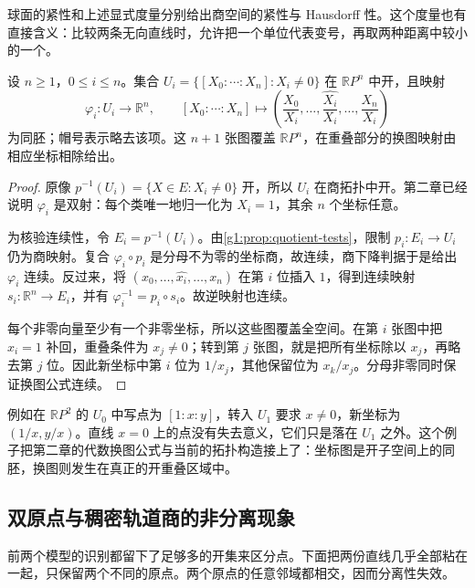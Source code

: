 球面的紧性和上述显式度量分别给出商空间的紧性与 Hausdorff 性。这个度量也有直接含义：比较两条无向直线时，允许把一个单位代表变号，再取两种距离中较小的一个。

\begin{proposition}\label{g1:prop:real-projective-topological-charts}
	设 \(n\ge1\)，\(0\le i\le n\)。集合 \(U_i=\{[X_0:\cdots:X_n]:X_i\ne0\}\) 在 \(\mathbb RP^n\) 中开，且映射
	\[
		\varphi_i:U_i\longrightarrow\mathbb R^n,\qquad
		[X_0:\cdots:X_n]\longmapsto
		\left(\frac{X_0}{X_i},\ldots,\widehat{\frac{X_i}{X_i}},\ldots,\frac{X_n}{X_i}\right)
	\]
	为同胚；帽号表示略去该项。这 \(n+1\) 张图覆盖 \(\mathbb RP^n\)，在重叠部分的换图映射由相应坐标相除给出。
\end{proposition}
\begin{proof}
	原像 \(p^{-1}(U_i)=\{X\in E:X_i\ne0\}\) 开，所以 \(U_i\) 在商拓扑中开。第二章已经说明 \(\varphi_i\) 是双射：每个类唯一地归一化为 \(X_i=1\)，其余 \(n\) 个坐标任意。

	为核验连续性，令 \(E_i=p^{-1}(U_i)\)。由\cref{g1:prop:quotient-tests}，限制 \(p_i:E_i\to U_i\) 仍为商映射。复合 \(\varphi_i\circ p_i\) 是分母不为零的坐标商，故连续，商下降判据于是给出 \(\varphi_i\) 连续。反过来，将 \((x_0,\ldots,\widehat{x_i},\ldots,x_n)\) 在第 \(i\) 位插入 \(1\)，得到连续映射 \(s_i:\mathbb R^n\to E_i\)，并有 \(\varphi_i^{-1}=p_i\circ s_i\)。故逆映射也连续。

	每个非零向量至少有一个非零坐标，所以这些图覆盖全空间。在第 \(i\) 张图中把 \(x_i=1\) 补回，重叠条件为 \(x_j\ne0\)；转到第 \(j\) 张图，就是把所有坐标除以 \(x_j\)，再略去第 \(j\) 位。因此新坐标中第 \(i\) 位为 \(1/x_j\)，其他保留位为 \(x_k/x_j\)。分母非零同时保证换图公式连续。
\end{proof}

例如在 \(\mathbb RP^2\) 的 \(U_0\) 中写点为 \([1:x:y]\)，转入 \(U_1\) 要求 \(x\ne0\)，新坐标为 \((1/x,y/x)\)。直线 \(x=0\) 上的点没有失去意义，它们只是落在 \(U_1\) 之外。这个例子把第二章的代数换图公式与当前的拓扑构造接上了：坐标图是开子空间上的同胚，换图则发生在真正的开重叠区域中。

\subsection{双原点与稠密轨道商的非分离现象}
\label{g1:subsec:0405:03}

前两个模型的识别都留下了足够多的开集来区分点。下面把两份直线几乎全部粘在一起，只保留两个不同的原点。两个原点的任意邻域都相交，因而分离性失效。

